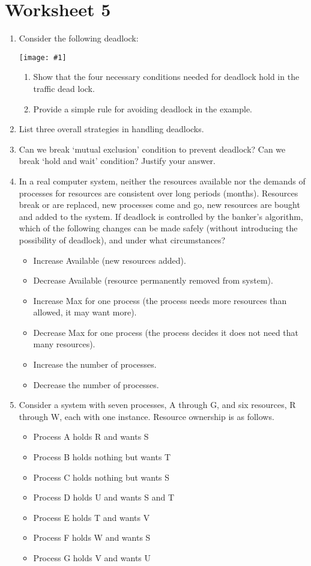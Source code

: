 \documentclass{article}
\newcommand{\answercolor}{Bittersweet}
\newcommand{\answer}[1]{\\\textcolor{\answercolor}{#1}}
\newcommand{\answerimg}[1]{\answer{\begin{figure*}[h]\centering\texttt{[image: \#1]}\end{figure*}}}
\begin{document}
	\raggedright
	\tableofcontents
	\section{Worksheet 5}
	\begin{enumerate}
		\item Consider the following deadlock:
		\answerimg{T5Q1.png}
		\begin{enumerate}
			\item Show that the four necessary conditions needed for deadlock hold in the traffic dead lock.
			\item Provide a simple rule for avoiding deadlock in the example.
		\end{enumerate}
		\item List three overall strategies in handling deadlocks.
		\item Can we break ‘mutual exclusion’ condition to prevent deadlock? Can we break ‘hold and wait’ condition? Justify your answer.
		\item In a real computer system, neither the resources available nor the demands of processes for resources are consistent over long periods (months). Resources break or are replaced, new processes come and go, new resources are bought and added to the system. If deadlock is controlled by the banker’s algorithm, which of the following changes can be made safely (without introducing the possibility of deadlock), and under what circumstances?
		\begin{itemize}
			\item Increase Available (new resources added).
			\item Decrease Available (resource permanently removed from system).
			\item Increase Max for one process (the process needs more resources than allowed, it may want more).
			\item Decrease Max for one process (the process decides it does not need that many resources).
			\item Increase the number of processes.
			\item Decrease the number of processes.
		\end{itemize}
		\item Consider a system with seven processes, A through G, and six resources, R through W, each with one instance. Resource ownership is as follows.
		\begin{itemize}
			\item Process A holds R and wants S
			\item Process B holds nothing but wants T
			\item Process C holds nothing but wants S
			\item Process D holds U and wants S and T
			\item Process E holds T and wants V
			\item Process F holds W and wants S
			\item Process G holds V and wants U
		\end{itemize}
	

\end{enumerate}
\end{document}
